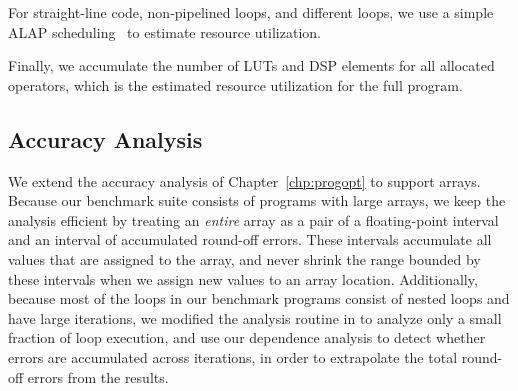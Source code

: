 For straight-line code, non-pipelined loops, and different loops, we use a
simple ALAP scheduling~\cite{wang_hls} to estimate resource utilization.

Finally, we accumulate the number of LUTs and DSP elements for all allocated
operators, which is the estimated resource utilization for the full program.


\subsection{Accuracy Analysis}
\label{lo:sub:accuracy_analysis}

We extend the accuracy analysis of Chapter~\ref{chp:progopt} to support
arrays. Because our benchmark suite consists of programs with large arrays,
we keep the analysis efficient by treating an \emph{entire} array as a pair
of a floating-point interval and an interval of accumulated round-off errors.
These intervals accumulate all values that are assigned to the array, and
never shrink the range bounded by these intervals when we assign new values to
an array location.  Additionally, because most of the loops in our benchmark
programs consist of nested loops and have large iterations, we modified the
analysis routine in \SOAP{} to analyze only a small fraction of loop execution,
and use our dependence analysis to detect whether errors are accumulated
across iterations, in order to extrapolate the total round-off errors from the
results.


